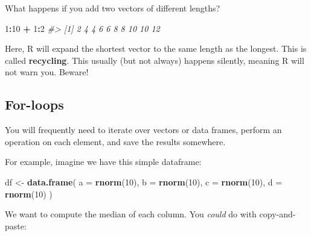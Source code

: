 \documentclass[]{book}
\newenvironment{Shaded}{\begin{snugshade}}{\end{snugshade}}
\newcommand{\KeywordTok}[1]{\textcolor[rgb]{0.13,0.29,0.53}{\textbf{#1}}}
\newcommand{\DataTypeTok}[1]{\textcolor[rgb]{0.13,0.29,0.53}{#1}}
\newcommand{\DecValTok}[1]{\textcolor[rgb]{0.00,0.00,0.81}{#1}}
\newcommand{\StringTok}[1]{\textcolor[rgb]{0.31,0.60,0.02}{#1}}
\newcommand{\CommentTok}[1]{\textcolor[rgb]{0.56,0.35,0.01}{\textit{#1}}}
\newcommand{\OperatorTok}[1]{\textcolor[rgb]{0.81,0.36,0.00}{\textbf{#1}}}
\newcommand{\NormalTok}[1]{#1}
\begin{document}
What happens if you add two vectors of different lengths?

\begin{Shaded}
\begin{Highlighting}[]
\DecValTok{1}\OperatorTok{:}\DecValTok{10} \OperatorTok{+}\StringTok{ }\DecValTok{1}\OperatorTok{:}\DecValTok{2}
\CommentTok{#>  [1]  2  4  4  6  6  8  8 10 10 12}
\end{Highlighting}
\end{Shaded}

Here, R will expand the shortest vector to the same length as the
longest. This is called \textbf{recycling}. This usually (but not
always) happens silently, meaning R will not warn you. Beware!

\subsection{For-loops}\label{for-loops}

You will frequently need to iterate over vectors or data frames, perform
an operation on each element, and save the results somewhere.

For example, imagine we have this simple dataframe:

\begin{Shaded}
\begin{Highlighting}[]
\NormalTok{df <-}\StringTok{ }\KeywordTok{data.frame}\NormalTok{(}
  \DataTypeTok{a =} \KeywordTok{rnorm}\NormalTok{(}\DecValTok{10}\NormalTok{),}
  \DataTypeTok{b =} \KeywordTok{rnorm}\NormalTok{(}\DecValTok{10}\NormalTok{),}
  \DataTypeTok{c =} \KeywordTok{rnorm}\NormalTok{(}\DecValTok{10}\NormalTok{),}
  \DataTypeTok{d =} \KeywordTok{rnorm}\NormalTok{(}\DecValTok{10}\NormalTok{)}
\NormalTok{)}
\end{Highlighting}
\end{Shaded}

We want to compute the median of each column. You \emph{could} do with
copy-and-paste:

\begin{Shaded}
\end{Shaded}
\end{document}
